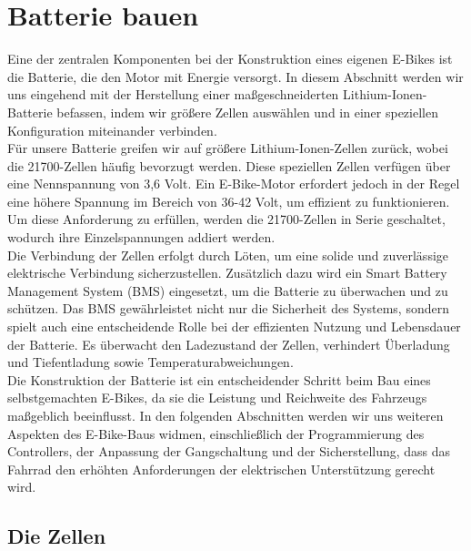 \chapter{Batterie bauen}
Eine der zentralen Komponenten bei der Konstruktion eines eigenen E-Bikes ist die Batterie, die den Motor mit Energie versorgt. In diesem Abschnitt werden wir uns eingehend mit der Herstellung einer maßgeschneiderten Lithium-Ionen-Batterie befassen, indem wir größere Zellen auswählen und in einer speziellen Konfiguration miteinander verbinden.\\

Für unsere Batterie greifen wir auf größere Lithium-Ionen-Zellen zurück, wobei die 21700-Zellen häufig bevorzugt werden. Diese speziellen Zellen verfügen über eine Nennspannung von 3,6 Volt. Ein E-Bike-Motor erfordert jedoch in der Regel eine höhere Spannung im Bereich von 36-42 Volt, um effizient zu funktionieren. Um diese Anforderung zu erfüllen, werden die 21700-Zellen in Serie geschaltet, wodurch ihre Einzelspannungen addiert werden.\\

Die Verbindung der Zellen erfolgt durch Löten, um eine solide und zuverlässige elektrische Verbindung sicherzustellen. Zusätzlich dazu wird ein Smart Battery Management System (BMS) eingesetzt, um die Batterie zu überwachen und zu schützen. Das BMS gewährleistet nicht nur die Sicherheit des Systems, sondern spielt auch eine entscheidende Rolle bei der effizienten Nutzung und Lebensdauer der Batterie. Es überwacht den Ladezustand der Zellen, verhindert Überladung und Tiefentladung sowie Temperaturabweichungen.\\

Die Konstruktion der Batterie ist ein entscheidender Schritt beim Bau eines selbstgemachten E-Bikes, da sie die Leistung und Reichweite des Fahrzeugs maßgeblich beeinflusst. In den folgenden Abschnitten werden wir uns weiteren Aspekten des E-Bike-Baus widmen, einschließlich der Programmierung des Controllers, der Anpassung der Gangschaltung und der Sicherstellung, dass das Fahrrad den erhöhten Anforderungen der elektrischen Unterstützung gerecht wird.\\ 


\section{Die Zellen}


